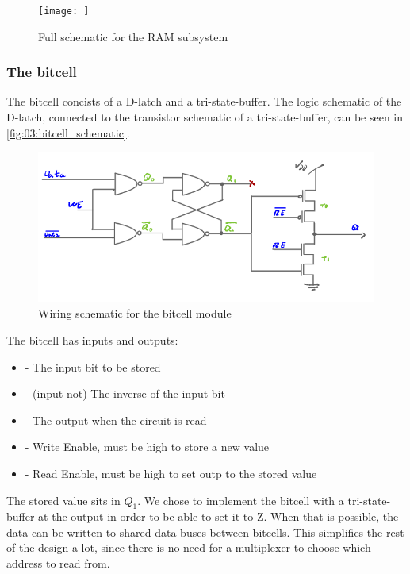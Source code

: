 \begin{figure}
    \centering
    \texttt{[image: ]}
    \caption{Full schematic for the RAM subsystem}
    \label{fig:03:RAM_schematic}
\end{figure}


\subsubsection{The bitcell}
The bitcell concists of a D-latch and a tri-state-buffer. The logic schematic of the D-latch, connected to the transistor schematic of a tri-state-buffer, can be seen in \autoref{fig:03:bitcell_schematic}.

\begin{figure}
    \centering
    \includegraphics[width=0.8\linewidth]{LaTeX_2/Figures/bitcell.png}
    \caption{Wiring schematic for the bitcell module}
    \label{fig:03:bitcell_schematic}
\end{figure}

The bitcell has inputs and outputs:
\begin{itemize}
    \item {} - The input bit to be stored
    \item {} - (input not) The inverse of the input bit
    \item {} - The output when the circuit is read
    \item {} - Write Enable, must be high to store a new value
    \item {} - Read Enable, must be high to set outp to the stored value
\end{itemize}
The stored value sits in $Q_1$. We chose to implement the bitcell with a tri-state-buffer at the output in order to be able to set it to Z. When that is possible, the data can be written to shared data buses between bitcells. This simplifies the rest of the design a lot, since there is no need for a multiplexer to choose which address to read from.

